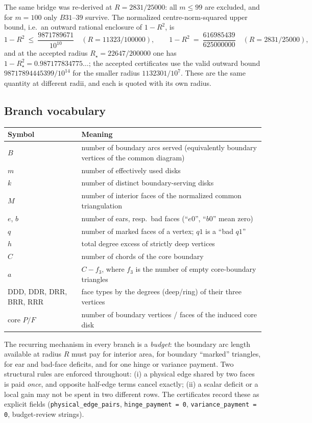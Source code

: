 The same bridge was re-derived at $R=2831/25000$: all $m\le99$ are excluded, and for $m=100$ only
$B31$--$39$ survive. The normalized centre-norm-squared upper bound, i.e.\ an outward rational
enclosure of $1-R^2$, is
\[
1-R^2\ \le\ \frac{9871789671}{10^{10}}\quad(R=11323/100000),\qquad
1-R^2\ =\ \frac{616985439}{625000000}\quad(R=2831/25000),
\]
and at the accepted radius $R_\star=22647/200000$ one has
$1-R_\star^2=0.987177834775\ldots$; the accepted certificates use the valid outward bound
$98717894445399/10^{14}$ for the smaller radius $1132301/10^7$. These are the same quantity at
different radii, and each is quoted with its own radius.

\subsection{Branch vocabulary}

\begin{center}
\footnotesize
\begin{tabular}{@{}lp{}@{}}
\toprule
Symbol & Meaning \\
\midrule
$B$ & number of boundary arcs served (equivalently boundary vertices of the common diagram) \\
$m$ & number of effectively used disks \\
$k$ & number of distinct boundary-serving disks \\
$M$ & number of interior faces of the normalized common triangulation \\
$e$, $b$ & number of ears, resp.\ bad faces (``$e0$'', ``$b0$'' mean zero) \\
$q$ & number of marked faces of a vertex; $q1$ is a ``bad $q1$'' \\
$h$ & total degree excess of strictly deep vertices \\
$C$ & number of chords of the core boundary \\
$a$ & $C-f_3$, where $f_3$ is the number of empty core-boundary triangles \\
DDD, DDR, DRR, BRR, RRR & face types by the degrees (deep/ring) of their three vertices \\
core $P/F$ & number of boundary vertices / faces of the induced core disk \\
\bottomrule
\end{tabular}
\end{center}

The recurring mechanism in every branch is a \emph{budget}: the boundary arc length available at
radius $R$ must pay for interior area, for boundary ``marked'' triangles, for ear and bad-face
deficits, and for one hinge or variance payment. Two structural rules are enforced throughout:
(i) a physical edge shared by two faces is paid \emph{once}, and opposite half-edge terms cancel
exactly; (ii) a scalar deficit or a local gain may not be spent in two different rows. The
certificates record these as explicit fields (\texttt{physical\_\allowbreak{}edge\_\allowbreak{}pairs},
\texttt{hinge\_\allowbreak{}payment = 0}, \texttt{variance\_\allowbreak{}payment = 0}, budget-review strings).

